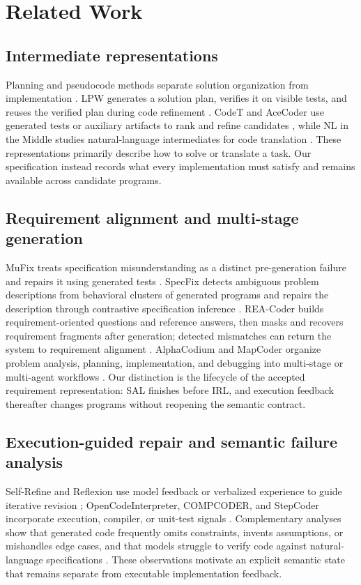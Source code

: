 \documentclass{article}
\begin{document}
\section{Related Work}

\subsection{Intermediate representations}
Planning and pseudocode methods separate solution organization from implementation \citep{ref_self_planning,ref_pseudocode_prompting}. LPW generates a solution plan, verifies it on visible tests, and reuses the verified plan during code refinement \citep{ref_planning_driven_programming}. CodeT and AceCoder use generated tests or auxiliary artifacts to rank and refine candidates \citep{ref_codet,ref_acecoder}, while NL in the Middle studies natural-language intermediates for code translation \citep{ref_nl_middle}. These representations primarily describe how to solve or translate a task. Our specification instead records what every implementation must satisfy and remains available across candidate programs.

\subsection{Requirement alignment and multi-stage generation}
MuFix treats specification misunderstanding as a distinct pre-generation failure and repairs it using generated tests \citep{ref_mufix}. SpecFix detects ambiguous problem descriptions from behavioral clusters of generated programs and repairs the description through contrastive specification inference \citep{ref_specfix}. REA-Coder builds requirement-oriented questions and reference answers, then masks and recovers requirement fragments after generation; detected mismatches can return the system to requirement alignment \citep{ref_reacoder}. AlphaCodium and MapCoder organize problem analysis, planning, implementation, and debugging into multi-stage or multi-agent workflows \citep{ref_alphacodium,ref_mapcoder}. Our distinction is the lifecycle of the accepted requirement representation: SAL finishes before IRL, and execution feedback thereafter changes programs without reopening the semantic contract.

\subsection{Execution-guided repair and semantic failure analysis}
Self-Refine and Reflexion use model feedback or verbalized experience to guide iterative revision \citep{ref_self_refine,ref_reflexion}; OpenCodeInterpreter, COMPCODER, and StepCoder incorporate execution, compiler, or unit-test signals \citep{ref_opencodeinterpreter,ref_compiler_feedback,ref_stepcoder}. Complementary analyses show that generated code frequently omits constraints, invents assumptions, or mishandles edge cases, and that models struggle to verify code against natural-language specifications \citep{ref_bug_study,ref_codegen_error_taxonomy,ref_nl_spec_verification_failure}. These observations motivate an explicit semantic state that remains separate from executable implementation feedback.
\end{document}
